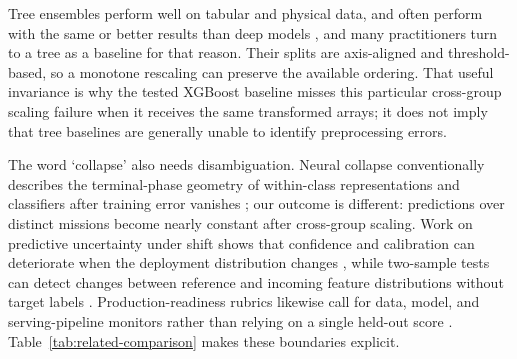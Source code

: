 \documentclass{IEEEtaes}
\begin{document}
Tree ensembles perform well on tabular and physical data, and often perform with the same or better results than deep models \cite{chen2016,grinsztajn2022,shwartz2022,ke2017,pasaribu2024}, and many practitioners turn to a tree as a baseline for that reason. Their splits are axis-aligned and threshold-based, so a monotone rescaling can preserve the available ordering. That useful invariance is why the tested XGBoost baseline misses this particular cross-group scaling failure when it receives the same transformed arrays; it does not imply that tree baselines are generally unable to identify preprocessing errors.

The word `collapse' also needs disambiguation. Neural collapse conventionally describes the terminal-phase geometry of within-class representations and classifiers after training error vanishes \cite{papyan2020}; our outcome is different: predictions over distinct missions become nearly constant after cross-group scaling. Work on predictive uncertainty under shift shows that confidence and calibration can deteriorate when the deployment distribution changes \cite{ovadia2019}, while two-sample tests can detect changes between reference and incoming feature distributions without target labels \cite{rabanser2019}. Production-readiness rubrics likewise call for data, model, and serving-pipeline monitors rather than relying on a single held-out score \cite{breck2017}. Table~\ref{tab:related-comparison} makes these boundaries explicit.
\end{document}
